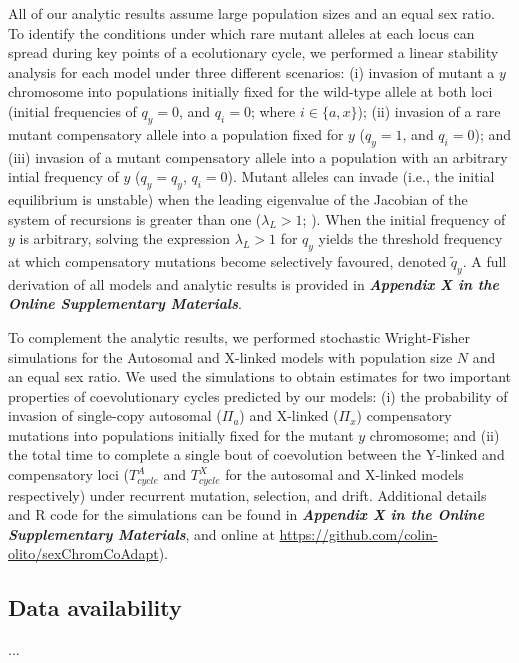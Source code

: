 \documentclass{article}
\begin{document}
All of our analytic results assume large population sizes and an equal sex ratio. To identify the conditions under which rare mutant alleles at each locus can spread during key points of a ecolutionary cycle, we performed a linear stability analysis for each model under three different scenarios: (i) invasion of mutant a $y$ chromosome into populations initially fixed for the wild-type allele at both loci (initial frequencies of $q_y = 0$, and $q_i = 0$; where $i \in \{a,x\}$); (ii) invasion of a rare mutant compensatory allele into a population fixed for $y$ ($q_y = 1$, and $q_i = 0$); and (iii) invasion of a mutant compensatory allele into a population with an arbitrary intial frequency of $y$ ($q_y = q_y$, $q_i = 0$). Mutant alleles can invade (i.e., the initial equilibrium is unstable) when the leading eigenvalue of the Jacobian of the system of recursions is greater than one ($\lambda_L > 1$; \citealt{OttoDay2007}). When the initial frequency of $y$ is arbitrary, solving the expression $\lambda_L > 1$ for $q_y$ yields the threshold frequency at which compensatory mutations become selectively favoured, denoted $\tilde{q}_{y}$. A full derivation of all models and analytic results is provided in {\bf \itshape Appendix X in the Online Supplementary Materials}.

To complement the analytic results, we performed stochastic Wright-Fisher simulations for the Autosomal and X-linked models with population size $N$ and an equal sex ratio. We used the simulations to obtain estimates for two important properties of coevolutionary cycles predicted by our models: (i) the probability of invasion of single-copy autosomal ($\Pi_a$) and X-linked ($\Pi_x$) compensatory mutations into populations initially fixed for the mutant $y$ chromosome; and (ii) the total time to complete a single bout of coevolution between the Y-linked and compensatory loci ($T^{A}_{cycle}$ and $T^{X}_{cycle}$ for the autosomal and X-linked models respectively) under recurrent mutation, selection, and drift. Additional details and R code for the simulations can be found in {\bf \itshape Appendix X in the Online Supplementary Materials}, and online at \url{https://github.com/colin-olito/sexChromCoAdapt}).






\subsection*{Data availability}
...
\end{document}
